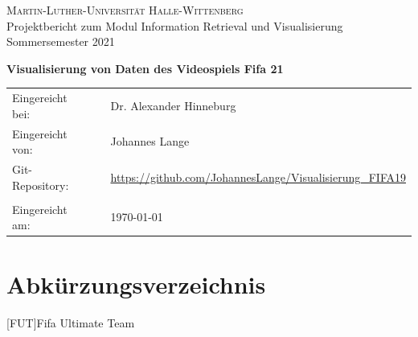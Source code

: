 \documentclass[usegeometry=true]{scrartcl}
\begin{document}

\begin{titlepage}
	\begin{center}
		\large{\textsc{Martin-Luther-Universität Halle-Wittenberg}}\\
				

		Projektbericht zum Modul Information Retrieval und Visualisierung Sommersemester 2021
	\end{center}

	\begin{center}
		\Large
		\textbf{Visualisierung von Daten des Videospiels Fifa 21}
	\end{center}

	\vskip 1cm

	\vskip 0.75cm

	\begin{center}
		\begin{tabular}{lll}
			Eingereicht bei:& & Dr. Alexander Hinneburg\\
			Eingereicht von:  & & Johannes Lange \\
			Git-Repository: & & \url{https://github.com/JohannesLange/Visualisierung_FIFA19}\\
			& & \\
			Eingereicht am: & & \today
		\end{tabular}
	\end{center}

\end{titlepage}




\newpage
\tableofcontents
\newpage

\clearpage
\listoffigures

\section*{Abkürzungsverzeichnis}\label{AV}
	\begin{acronym}
	[FUT]{Fifa Ultimate Team}
	\end{acronym}
\newpage
\end{document}
